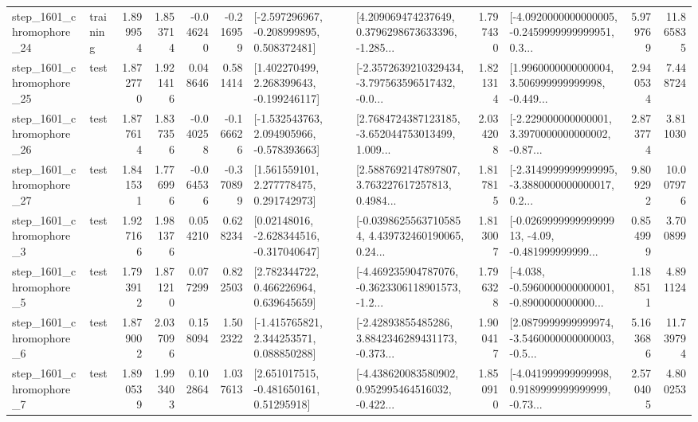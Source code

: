 \begin{tabular}{llrrrrllrlrr}
 step\_1601\_chromophore\_24 &  training &      1.899954 &    1.853714 &     -0.046240 & -0.216959 &   [-2.597296967, -0.208999895, 0.508372481] &  [4.209069474237649, 0.3796298673633396, -1.285... &       1.797430 &  [-4.0920000000000005, -0.2459999999999951, 0.3... &            5.979769 &         11.865835 \\
 step\_1601\_chromophore\_25 &      test &      1.872770 &    1.921416 &      0.048646 &  0.581414 &    [1.402270499, 2.268399643, -0.199246117] &  [-2.3572639210329434, -3.797563596517432, -0.0... &       1.821314 &  [1.9960000000000004, 3.506999999999998, -0.449... &            2.940534 &          7.448724 \\
 step\_1601\_chromophore\_26 &      test &      1.877614 &    1.837356 &     -0.040258 & -0.166626 &   [-1.532543763, 2.094905966, -0.578393663] &  [2.7684724387123185, -3.652044753013499, 1.009... &       2.034208 &  [-2.229000000000001, 3.3970000000000002, -0.87... &            2.873774 &          3.811030 \\
 step\_1601\_chromophore\_27 &      test &      1.841531 &    1.776996 &     -0.064536 & -0.370899 &     [1.561559101, 2.277778475, 0.291742973] &  [2.5887692147897807, 3.763227617257813, 0.4984... &       1.817815 &  [-2.3149999999999995, -3.3880000000000017, 0.2... &            9.809292 &         10.007976 \\
  step\_1601\_chromophore\_3 &      test &      1.927166 &    1.981376 &      0.054210 &  0.628234 &    [0.02148016, -2.628344516, -0.317040647] &  [-0.03986255637105854, 4.439732460190065, 0.24... &       1.813007 &  [-0.026999999999999913, -4.09, -0.481999999999... &            0.854999 &          3.700899 \\
  step\_1601\_chromophore\_5 &      test &      1.793912 &    1.871210 &      0.077299 &  0.822503 &     [2.782344722, 0.466226964, 0.639645659] &  [-4.469235904787076, -0.3623306118901573, -1.2... &       1.796328 &  [-4.038, -0.5960000000000001, -0.8900000000000... &            1.188511 &          4.891124 \\
  step\_1601\_chromophore\_6 &      test &      1.879002 &    2.037096 &      0.158094 &  1.502322 &    [-1.415765821, 2.344253571, 0.088850288] &  [-2.42893855485286, 3.8842346289431173, -0.373... &       1.900417 &  [2.0879999999999974, -3.5460000000000003, -0.5... &            5.163686 &         11.739794 \\
  step\_1601\_chromophore\_7 &      test &      1.890539 &    1.993403 &      0.102864 &  1.037613 &     [2.651017515, -0.481650161, 0.51295918] &  [-4.438620083580902, 0.952995464516032, -0.422... &       1.850910 &  [-4.041999999999998, 0.9189999999999999, -0.73... &            2.570405 &          4.800253 \\

\end{tabular}
